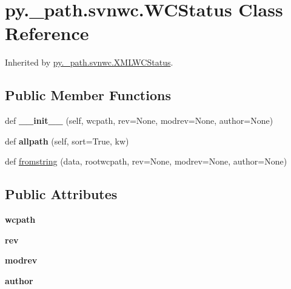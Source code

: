 \hypertarget{classpy_1_1__path_1_1svnwc_1_1_w_c_status}{}\section{py.\+\_\+path.\+svnwc.\+W\+C\+Status Class Reference}
\label{classpy_1_1__path_1_1svnwc_1_1_w_c_status}


Inherited by \hyperlink{classpy_1_1__path_1_1svnwc_1_1_x_m_l_w_c_status}{py.\+\_\+path.\+svnwc.\+X\+M\+L\+W\+C\+Status}.

\subsection*{Public Member Functions}
\begin{DoxyCompactItemize}
\item 
\mbox{\label{classpy_1_1__path_1_1svnwc_1_1_w_c_status_a971a401b89d99147ba042a0b3038552a}} 
def {\bfseries \+\_\+\+\_\+init\+\_\+\+\_\+} (self, wcpath, rev=None, modrev=None, author=None)
\item 
\mbox{\label{classpy_1_1__path_1_1svnwc_1_1_w_c_status_aeb25f50ea4c439f878ba90bd0fde420e}} 
def {\bfseries allpath} (self, sort=True, kw)
\item 
def \hyperlink{classpy_1_1__path_1_1svnwc_1_1_w_c_status_a9a69f40c2d4544d0424565e9786723c9}{fromstring} (data, rootwcpath, rev=None, modrev=None, author=None)
\end{DoxyCompactItemize}
\subsection*{Public Attributes}
\begin{DoxyCompactItemize}
\item 
\mbox{\label{classpy_1_1__path_1_1svnwc_1_1_w_c_status_a061b707b57710a1097285facdf317129}} 
{\bfseries wcpath}
\item 
\mbox{\label{classpy_1_1__path_1_1svnwc_1_1_w_c_status_ab1cfd555ee06d22eae2ab756553ee1ad}} 
{\bfseries rev}
\item 
\mbox{\label{classpy_1_1__path_1_1svnwc_1_1_w_c_status_aa4e577afdde6a072d5bda22d22e1bd1c}} 
{\bfseries modrev}
\item 
\mbox{\label{classpy_1_1__path_1_1svnwc_1_1_w_c_status_ae2b754a64c684149f9e2439fdca52235}} 
{\bfseries author}
\end{DoxyCompactItemize}
